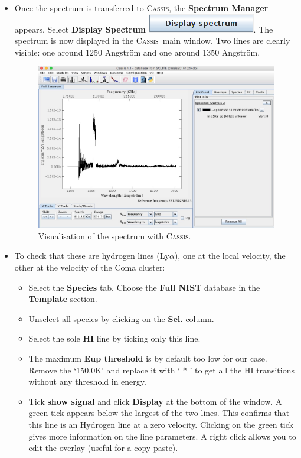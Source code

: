 \documentclass [a4paper, 12pt]{article}
\newcommand{\cassis}{{\textsc{Cassis}}}
\begin{document}
\begin{itemize}
\item Once the spectrum is transferred to \cassis, the \textbf{Spectrum 
Manager} appears. Select \textbf{Display Spectrum} \includegraphics[width=0.2  
\textwidth]{../images/cassis_button_display-spectrum.png}. The 
spectrum is now displayed in the \cassis\ main window. Two lines are clearly 
visible: one around 1250 Angstr\"om and one around 1350 Angstr\"om. 


\begin{figure}[H]
\center
\includegraphics[width=0.6  \textwidth]{../images/cassis_display_spectrum-1.jpg}
\caption{Visualisation of the spectrum with \cassis.}
\label{fig:spectrum}
\end{figure}
\item To check that these are hydrogen lines (Ly$\alpha$), one at the local 
velocity, the other at the velocity of the Coma cluster:
\begin{itemize}
    \item Select the \textbf{Species} tab. Choose the \textbf{Full NIST} 
    database in the \textbf{Template} section.
    \item Unselect all species by clicking on the \textbf{Sel.} column.
    \item Select the sole \textbf{HI} line by ticking only this line.
    \item The maximum \textbf{Eup threshold} is by default too low for our 
    case. Remove the `150.0K' and replace it with ` *  ' to get all the HI 
    transitions without any threshold in energy.
    \item Tick \textbf{show signal} and click \textbf{Display} at the bottom of 
    the window. A green tick appears below the largest of the two lines. This 
    confirms that this line is an Hydrogen line at a zero velocity. Clicking on 
    the green tick gives more information on the line parameters. A right click 
    allows you to edit the overlay (useful for a copy-paste).
\end{itemize}


\end{itemize}
\end{document}
